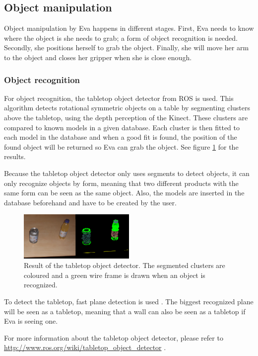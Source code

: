 \documentclass[project_eva.tex]{subfiles}
\begin{document}
\subsection*{Object manipulation}
Object manipulation by Eva happens in different stages. First, Eva needs to know where the object is she needs to grab; a 
form of object recognition is needed. Secondly, she  positions herself to grab the object. Finally, she will move her 
arm to the object and closes her gripper when she is close enough.

\subsubsection*{Object recognition}
For object recognition, the tabletop object detector from ROS is used. This algorithm detects rotational symmetric 
objects on a table by segmenting clusters above the tabletop, using the depth perception of the Kinect. These clusters are compared to known models in a given database. 
Each cluster is then fitted to each model in the database and when a good fit is found, the position of the found object 
will be returned so Eva can grab the object. See figure \ref{fig:tabletop} for the results.

Because the tabletop object detector only uses segments to detect objects, it can only recognize objects by form, meaning 
that two different products with the same form can be seen as the same object. Also, the models are inserted in the 
database beforehand and have to be created by the user.

\begin{figure}[h]
	\centering
	\mbox{\includegraphics[width=0.5\textwidth]{Images/object_detector.png}}
	\caption{Result of the tabletop object detector. The segmented clusters are coloured and a green wire frame is drawn 
	when an object is recognized.}
	\label{fig:tabletop}
\end{figure}

To detect the tabletop, fast plane detection is used \cite{plane}. The biggest recognized plane will be seen as a 
tabletop, meaning that a wall can also be seen as a 
tabletop if Eva is seeing one.

For more information about the tabletop object detector, please refer to 
\url{http://www.ros.org/wiki/tabletop\_object\_detector} \cite{tabletop}.
\end{document}
